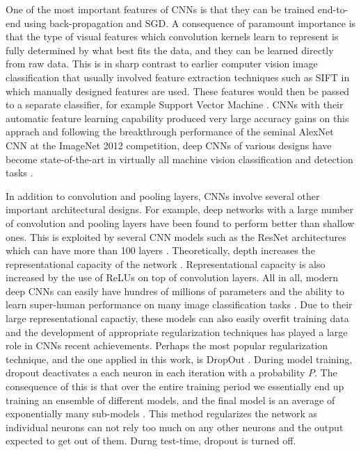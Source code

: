\documentclass[12pt]{report}
\begin{document}
One of the most important features of CNNs is that they can be trained end-to-end using back-propagation and SGD. A consequence of paramount importance is that the type of visual features which convolution kernels learn to represent is fully determined by what best fits the data, and they can be learned directly from raw data. This is in sharp contrast to earlier computer vision image classification that usually involved feature extraction techniques \cite{Prince2012} such as SIFT \cite{Lowe1999} in which manually designed features are used. These features would then be passed to a separate classifier, for example Support Vector Machine \cite{Weston2010}. CNNs with their automatic feature learning capability produced very large accuracy gains on this apprach \cite{Razavian2014} and following the breakthrough performance of the seminal AlexNet CNN \cite{Krizhevsky2012} at the ImageNet 2012 competition, deep CNNs of various designs have become state-of-the-art in virtually all machine vision classification and detection tasks \cite{JurgenSchmidhuber2015}.

In addition to convolution and pooling layers, CNNs involve several other important architectural designs. For example, deep networks with a large number of convolution and pooling layers have been found to perform better \cite{Srivastava2015} than shallow ones. This is exploited by several CNN models such as the ResNet architectures which can have more than 100 layers \cite{He2015}. Theoretically, depth increases the representational capacity of the network \cite{Sun2015}. Representational capacity is also increased by the use of ReLUs on top of convolution layers. All in all, modern deep CNNs can easily have hundres of millions of parameters and the ability to learn super-human performance on many image classification tasks \cite{Lecun2015}. Due to their large representational capactiy, these models can also easily overfit training data and the development of appropriate regularization techniques has played a large role in CNNs recent achievements. Perhaps the most popular regularization technique, and the one applied in this work, is DropOut \cite{Srivastava2014}. During model training, dropout deactivates a each neuron in each iteration with a probability $P$. The consequence of this is that over the entire training period we essentially end up training an ensemble of different models, and the final model is an average of exponentially many sub-models \cite{Goodfellow2016}. This method regularizes the network as individual neurons can not rely too much on any other neurons and the output expected to get out of them. Durng test-time, dropout is turned off.
\end{document}
